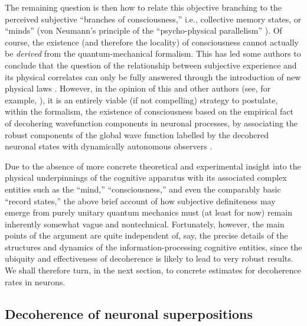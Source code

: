 \documentclass[12pt,aps,floatfix,amsmath,amssymb,showpacs,nofootinbib]{revtex4-2}
\begin{document}
The remaining question is then how to relate this objective branching
to the perceived subjective ``branches of consciousness,'' i.e.,
collective memory states, or ``minds'' (von Neumann's principle of the
``psycho-physical parallelism'' \cite{Neumann:1932:gq}). Of course,
the existence (and therefore the locality) of consciousness cannot
actually be {\em derived} from the quantum-mechanical formalism. This
has led some authors to conclude that the question of the relationship
between subjective experience and its physical correlates can only be
fully answered through the introduction of new physical laws
\cite{Donald:2002:um}.  However, in the opinion of this and other
authors (see, for example, \cite{Zeh:2000:rr,Zeh:2004:zm}), it is an
entirely viable (if not compelling) strategy to postulate, within the formalism, the
existence of consciousness based on the empirical fact of decohering
wavefunction components in neuronal processes, by associating the
robust components of the global wave function labelled by the
decohered neuronal states with dynamically autonomous observers
\cite{Zeh:1970:yt,Zeh:1973:wq,Lockwood:1996:pu,Zurek:1998:re,%
Zeh:2000:rr,Zurek:2002:ii,Zeh:2004:zm,Zurek:2004:yb}.

Due to the absence of more concrete theoretical and experimental
insight into the physical underpinnings of the cognitive apparatus
with its associated complex entities such as the ``mind,''
``consciousness,'' and even the comparably basic ``record states,''
the above brief account of how subjective definiteness may emerge from
purely unitary quantum mechanics must (at least for now) remain
inherently somewhat vague and nontechnical. Fortunately, however, the
main points of the argument are quite independent of, say, the precise
details of the structures and dynamics of the information-processing
cognitive entities, since the ubiquity and effectiveness of
decoherence is likely to lead to very robust results.  We shall
therefore turn, in the next section, to concrete estimates for 
decoherence rates in neurons.



\subsection{Decoherence of neuronal superpositions}
\end{document}
